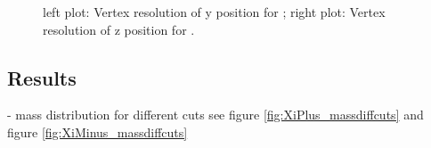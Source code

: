 		\begin{figure}
			\caption{left plot: Vertex resolution of y position for \anticascade; right plot: Vertex resolution of z position for \anticascade.}
			\label{fig:xi_vtxres_yz}
			
		\end{figure}
		
		
	\subsection{Results}
	
	- mass distribution for different cuts see figure \ref{fig:XiPlus_massdiffcuts} and figure \ref{fig:XiMinus_massdiffcuts}
		
